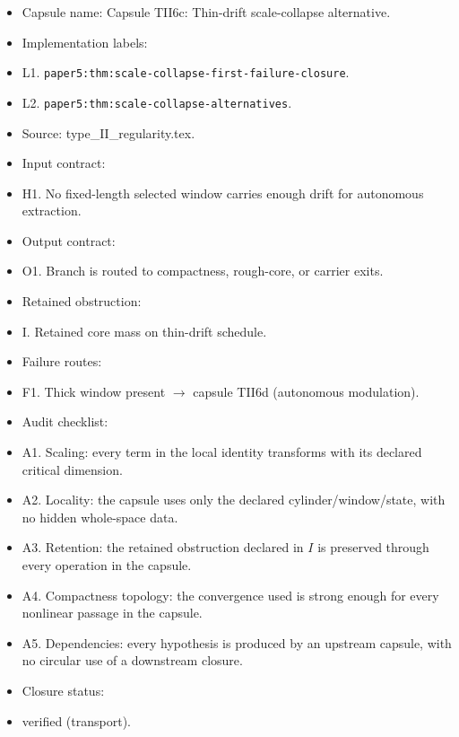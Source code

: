 \documentclass[11pt]{amsart}
\begin{document}
\begin{itemize}
  \item Capsule name: Capsule TII6c: Thin-drift scale-collapse alternative.
  \item Implementation labels:
  \item L1. \texttt{paper5:thm:scale-collapse-first-failure-closure}.
  \item L2. \texttt{paper5:thm:scale-collapse-alternatives}.
  \item Source: type\_II\_regularity.tex.
  \item Input contract:
  \item H1. No fixed-length selected window carries enough drift for autonomous extraction.
  \item Output contract:
  \item O1. Branch is routed to compactness, rough-core, or carrier exits.
  \item Retained obstruction:
  \item I. Retained core mass on thin-drift schedule.
  \item Failure routes:
  \item F1. Thick window present $\to$ capsule TII6d (autonomous modulation).
  \item Audit checklist:
  \item A1. Scaling: every term in the local identity transforms with its declared critical dimension.
  \item A2. Locality: the capsule uses only the declared cylinder/window/state, with no hidden whole-space data.
  \item A3. Retention: the retained obstruction declared in $I$ is preserved through every operation in the capsule.
  \item A4. Compactness topology: the convergence used is strong enough for every nonlinear passage in the capsule.
  \item A5. Dependencies: every hypothesis is produced by an upstream capsule, with no circular use of a downstream closure.
  \item Closure status:
  \item verified (transport).
\end{itemize}
\end{document}
